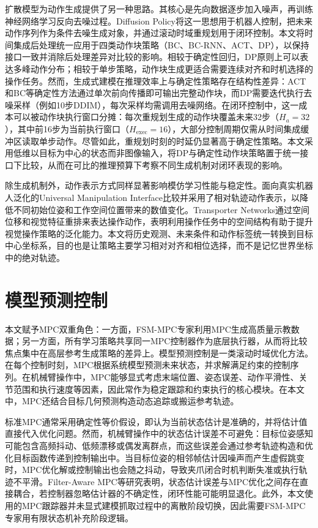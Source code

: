 扩散模型为动作生成提供了另一种思路。其核心是先向数据逐步加入噪声，再训练神经网络学习反向去噪过程\citep{ho2020denoising,song2021denoising}。Diffusion Policy将这一思想用于机器人控制，把未来动作序列作为条件去噪生成对象，并通过滚动时域重规划用于闭环控制\citep{chi2023diffusion}。本文将时间集成后处理统一应用于四类动作块策略（BC、BC-RNN、ACT、DP），以保持接口一致并消除后处理差异对比较的影响。相较于确定性回归，DP原则上可以表达多峰动作分布；相较于单步策略，动作块生成更适合需要连续对齐和时机选择的操作任务。然而，生成式建模在推理效率上与确定性策略存在结构性差异：ACT和BC等确定性方法通过单次前向传播即可输出完整动作块，而DP需要迭代执行去噪采样（例如10步DDIM），每次采样均需调用去噪网络。在闭环控制中，这一成本可以被动作块执行窗口分摊：每次重规划生成的动作块覆盖未来32步（$H_a=32$），其中前16步为当前执行窗口（$H_{\mathrm{exec}}=16$），大部分控制周期仅需从时间集成缓冲区读取单步动作。尽管如此，重规划时刻的时延仍显著高于确定性策略。本文采用低维以目标为中心的状态而非图像输入，将DP与确定性动作块策略置于统一接口下比较，从而在可比的推理预算下考察不同生成机制对闭环表现的影响。

除生成机制外，动作表示方式同样显著影响模仿学习性能与稳定性。面向真实机器人泛化的Universal Manipulation Interface比较并采用了相对轨迹动作表示，以降低不同初始位姿和工作空间位置带来的数值变化\citep{chi2024universal}。Transporter Networks通过空间位移和视觉特征重排来表达操作动作，表明利用操作任务中的空间结构有助于提升视觉操作策略的泛化能力\citep{zeng2021transporter}。本文将历史观测、未来条件和动作标签统一转换到目标中心坐标系，目的也是让策略主要学习相对对齐和相位选择，而不是记忆世界坐标中的绝对轨迹。

\section{模型预测控制}

本文赋予MPC双重角色：一方面，FSM-MPC专家利用MPC生成高质量示教数据；另一方面，所有学习策略共享同一MPC控制器作为底层执行器，从而将比较焦点集中在高层参考生成策略的差异上。模型预测控制是一类滚动时域优化方法。在每个控制时刻，MPC根据系统模型预测未来状态，并求解满足约束的控制序列\citep{rawlings2017model}。在机械臂操作中，MPC能够显式考虑末端位置、姿态误差、动作平滑性、关节范围和执行速度等因素，因此常作为稳定跟踪和约束执行的核心模块\citep{nubert2020safe}。在本文中，MPC还结合目标几何预测构造动态追踪或搬运参考轨迹。

标准MPC通常采用确定性等价假设，即认为当前状态估计是准确的，并将估计值直接代入优化问题\citep{rawlings2017model}。然而，机械臂操作中的状态估计误差不可避免：目标位姿感知可能包含高频抖动、低频漂移或偶发离群点，而这些误差会通过参考轨迹构造和优化目标函数传递到控制输出中。当目标位姿的相邻帧估计因噪声而产生虚假跳变时，MPC优化解或控制输出也会随之抖动，导致夹爪闭合时机判断失准或执行轨迹不平滑。Filter-Aware MPC等研究表明，状态估计误差与MPC优化之间存在直接耦合，若控制器忽略估计器的不确定性，闭环性能可能明显退化\citep{kayalibay2023filteraware}。此外，本文使用的MPC跟踪器并未显式建模抓取过程中的离散阶段切换，因此需要FSM-MPC专家用有限状态机补充阶段逻辑。

